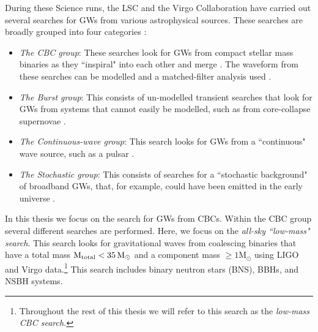 During these Science runs, the \ac{LSC} and the Virgo Collaboration have
carried out several searches for \acp{GW} from various astrophysical sources.
These searches are broadly grouped into four categories \cite{Abbott:2007kv}:
\begin{itemize}

\item{{\it The \ac{CBC} group}: These searches look for \acp{GW} from compact
stellar mass binaries as they ``inspiral" into each other and merge
\cite{Belczynski:2002}. The waveform from these searches can be modelled and a
matched-filter analysis used \cite{Allen:2005fk}}.

\item{{\it The Burst group}: This consists of un-modelled transient searches
that look for \acp{GW} from systems that cannot easily be modelled, such as from
core-collapse supernovae \cite{Anderson:2000yy}}.

\item{{\it The Continuous-wave group}: This search looks for \acp{GW} from a
``continuous" wave source, such as a pulsar \cite{Collaboration:S5Pulsar}}.

\item{{\it The Stochastic group}: This consists of searches for a ``stochastic
background" of broadband \acp{GW}, that, for example, could have been emitted
in the early universe \cite{Collaboration:S5stochastic}}.

\end{itemize} In this thesis we focus on the search for \acp{GW} from
\acp{CBC}. Within the \ac{CBC} group several different searches are performed.
Here, we focus on the \emph{all-sky ``low-mass" search}. This search looks for
gravitational waves from coalescing binaries that have a total mass
$\mathrm{M_{total}} < 35\,\mathrm{M_\odot}$ and a component mass $\mathrm{\geq 1M_\odot}$ using LIGO
and Virgo data.\footnote{Throughout the rest of this thesis we will refer to
this search as the \emph{low-mass \ac{CBC} search.}} This search includes
binary neutron stars (BNS), \acp{BBH}, and \ac{NSBH} systems.

